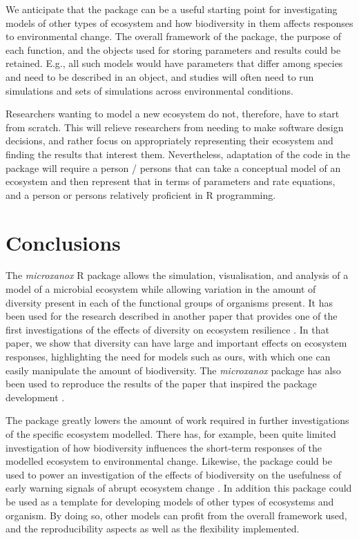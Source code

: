 \documentclass[]{elsarticle} %
\begin{document}
We anticipate that the package can be a useful starting point for investigating models of other types of ecosystem and how biodiversity in them affects responses to environmental change. The overall framework of the package, the purpose of each function, and the objects used for storing parameters and results could be retained. E.g., all such models would have parameters that differ among species and need to be described in an object, and studies will often need to run simulations and sets of simulations across environmental conditions.

Researchers wanting to model a new ecosystem do not, therefore, have to start from scratch. This will relieve researchers from needing to make software design decisions, and rather focus on appropriately representing their ecosystem and finding the results that interest them. Nevertheless, adaptation of the code in the package will require a person / persons that can take a conceptual model of an ecosystem and then represent that in terms of parameters and rate equations, and a person or persons relatively proficient in R programming.

\hypertarget{conclusions}{%
\section{Conclusions}\label{conclusions}}

The \emph{microxanox} R package allows the simulation, visualisation, and analysis of a model of a microbial ecosystem while allowing variation in the amount of diversity present in each of the functional groups of organisms present. It has been used for the research described in another paper that provides one of the first investigations of the effects of diversity on ecosystem resilience \citet{Limberger2023}. In that paper, we show that diversity can have large and important effects on ecosystem responses, highlighting the need for models such as ours, with which one can easily manipulate the amount of biodiversity. The \emph{microxanox} package has also been used to reproduce the results of the paper that inspired the package development \citep{Bush2017}.

The package greatly lowers the amount of work required in further investigations of the specific ecosystem modelled. There has, for example, been quite limited investigation of how biodiversity influences the short-term responses of the modelled ecosystem to environmental change. Likewise, the package could be used to power an investigation of the effects of biodiversity on the usefulness of early warning signals of abrupt ecosystem change \citep{Scheffer2009}. In addition this package could be used as a template for developing models of other types of ecosystems and organism. By doing so, other models can profit from the overall framework used, and the reproducibility aspects as well as the flexibility implemented.
\end{document}
